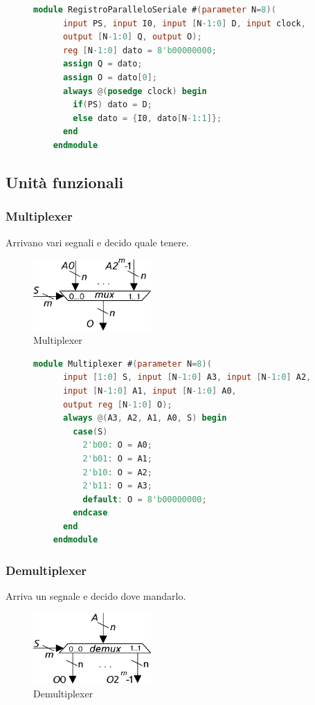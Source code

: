 \documentclass[a4paper]{article}
\theoremstyle{break}
\theoremstyle{break}
\theoremstyle{break}
\theoremstyle{break}
\begin{document}
\begin{figure}[H]
  \begin{lstlisting}[language=Verilog]
    module RegistroParalleloSeriale #(parameter N=8)(
      input PS, input I0, input [N-1:0] D, input clock,
      output [N-1:0] Q, output O);
      reg [N-1:0] dato = 8'b00000000;
      assign Q = dato;
      assign O = dato[0];
      always @(posedge clock) begin
        if(PS) dato = D;
        else dato = {I0, dato[N-1:1]};
      end
    endmodule
  \end{lstlisting}
\end{figure}

\subsection{Unità funzionali}
\subsubsection{Multiplexer}
Arrivano vari segnali e decido quale tenere.
\begin{figure}[H]
  \begin{center}
    \includegraphics[width=0.40\textwidth]{figures/mux}
  \end{center}
  \caption{Multiplexer}
\end{figure}

\begin{figure}[H]
  \begin{lstlisting}[language=Verilog]
    module Multiplexer #(parameter N=8)(
      input [1:0] S, input [N-1:0] A3, input [N-1:0] A2,
      input [N-1:0] A1, input [N-1:0] A0,
      output reg [N-1:0] O);
      always @(A3, A2, A1, A0, S) begin
        case(S)
          2'b00: O = A0;
          2'b01: O = A1;
          2'b10: O = A2;
          2'b11: O = A3;
          default: O = 8'b00000000;
        endcase
      end
    endmodule
  \end{lstlisting}
\end{figure}

\subsubsection{Demultiplexer}
Arriva un segnale e decido dove mandarlo.
\begin{figure}[H]
  \begin{center}
    \includegraphics[width=0.40\textwidth]{figures/demux}
  \end{center}
  \caption{Demultiplexer}
\end{figure}
\end{document}
